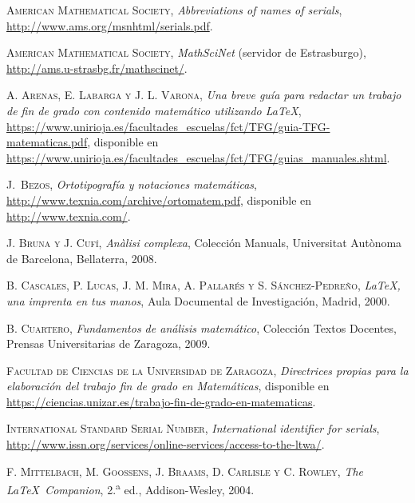 \documentclass[11pt]{book}
\theoremstyle{plain} %
\theoremstyle{definition} %
\begin{document}
\begin{thebibliography}{99}

\textsc{American Mathematical Society},
\textit{Abbreviations of names of serials},
\url{http://www.ams.org/msnhtml/serials.pdf}.

\textsc{American Mathematical Society},
\textit{MathSciNet} (servidor de Estrasburgo),
\url{http://ams.u-strasbg.fr/mathscinet/}.

\textsc{A. Arenas, E. Labarga y J. L. Varona},
\textit{Una breve guía para redactar un trabajo de fin de grado
con contenido matemático utilizando LaTeX},
\url{https://www.unirioja.es/facultades_escuelas/fct/TFG/guia-TFG-matematicas.pdf},
disponible en
\url{https://www.unirioja.es/facultades_escuelas/fct/TFG/guias_manuales.shtml}.

\textsc{J.~Bezos},
\textit{Ortotipografía y notaciones matemáticas},
\url{http://www.texnia.com/archive/ortomatem.pdf},
disponible en
\url{http://www.texnia.com/}.

\textsc{J. Bruna y J. Cufí},
\textit{An\`alisi complexa},
Colección Manuals, Universitat Aut\`onoma de Barcelona, Bellaterra, 2008.

\textsc{B. Cascales, P. Lucas, J. M. Mira, A. Pallarés y S. Sánchez-Pedreño}, 
\textit{LaTeX, una imprenta en tus manos}, 
Aula Documental de Investigaci\'on, Madrid, 2000.

\textsc{B. Cuartero},
\textit{Fundamentos de análisis matemático},
Colección Textos Docentes, Prensas Universitarias de Zaragoza, 2009.

\textsc{Facultad de Ciencias de la Universidad de Zaragoza},
\textit{Directrices propias para la elaboración del trabajo fin de grado en 
Matemáticas}, 
disponible en
\url{https://ciencias.unizar.es/trabajo-fin-de-grado-en-matematicas}.

\textsc{International Standard Serial Number},
\textit{International identifier for serials},
\url{http://www.issn.org/services/online-services/access-to-the-ltwa/}.


\textsc{F. Mittelbach, M. Goossens, J. Braams, D. Carlisle y C. Rowley}, 
\textit{The \LaTeX\ Companion}, 
2.\textsuperscript{a} ed., 
Addison-Wesley, 2004.


\end{thebibliography}
\end{document}
